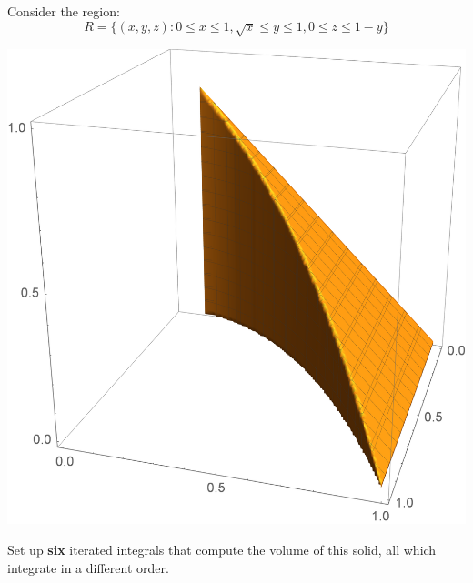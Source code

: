 \documentclass[handout,nooutcomes,noauthor]{ximera}
\begin{document}
\begin{problem}
  Consider the region:
  \[
  R=\{(x,y,z): 0 \le x \le 1, \sqrt{x}\le y \le 1, 0\le z\le 1-y\}
  \]
  \begin{image}[2in]
    \includegraphics{threeRegion1.png}
  \end{image}
  Set up \textbf{six} iterated integrals that compute the volume of this solid,
  all which integrate in a different order.
\end{problem}
\end{document}
